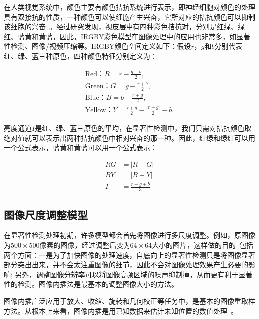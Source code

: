 在人类视觉系统中，颜色主要有颜色拮抗系统进行表示，即神经细胞对颜色的处理具有双接抗的性质，一种颜色可以使细胞产生兴奋，它所对应的拮抗颜色可以抑制该细胞的兴奋~\cite{Engel1997Colour}。经过研究发现，视皮层中有四种彩色拮抗对，分别是红绿、绿红、蓝黄和黄蓝，因此，IRGBY彩色模型在图像处理中的应用也非常多，如显著性检测、图像/视频压缩等。IRGBY颜色空间定义如下：假设$r$，$g$和$b$分别代表红、绿、蓝三种原色，四种颜色特征分别定义为：
\begin{linenomath}
\begin{align}
\textrm{Red：$R=r-\frac{g+b}{2}$,}\label{式2_6}\\
\textrm{Green：$G=g-\frac{r+b}{2}$,}\label{式2_7}\\
\textrm{Blue：$B=b-\frac{r+g}{2}$,}\label{式2_8}\\
\textrm{Yellow：$Y=\frac{r+g}{2}-\frac{|r+g|}{2}-b$.}\label{式2_9}
\end{align}
\end{linenomath}
亮度通道$I$是红、绿、蓝三原色的平均，在显著性检测中，我们只需对拮抗颜色取绝对值就可以表示出两种拮抗颜色中相对兴奋的那一种。因此，红绿和绿红可以用一个公式表示，蓝黄和黄蓝可以用一个公式表示：
\begin{linenomath}
\begin{align}
RG &= \big|R-G\big|\label{式2_10}\\
BY &= \big|B-Y\big|\label{式2_11}\\
I &= \frac{r+g+b}{3}\label{式2_12}
\end{align}
\end{linenomath}

\subsection{图像尺度调整模型}
\label{2_1_4}

在显著性检测处理初期，许多模型都会首先将图像进行多尺度调整。例如，原图像为$500×500$像素的图像，经过调整后变为$64×64$大小的图片，这样做的目的~\cite{ZhangLiming2010Book}包括两个方面：一是为了加快图像的处理速度，自底向上的显著性检测只是将图像显著部分突出出来，并不会太注重图像的细节，因此不会对图像处理效果产生必要的影响; 另外，调整图像分辨率可以将图像高频区域的噪声抑制掉，从而更有利于显著性的检测。图像内插法是最基本的调整图像大小的方法。

图像内插广泛应用于放大、收缩、旋转和几何校正等任务中，是基本的图像重取样方法。从根本上来看，图像内插是用已知数据来估计未知位置的数值处理~\cite{Gonzalez2005book}。

